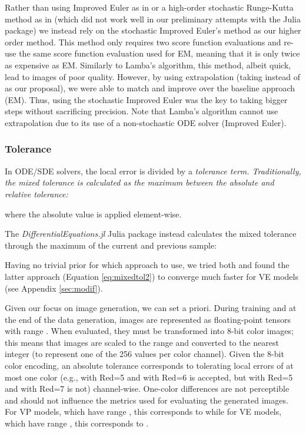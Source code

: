 \documentclass{article}
\begin{document}
Rather than using Improved Euler \citep{suli2003introduction} as in \citet{lamba2003adaptive} or a high-order stochastic Runge-Kutta method \citep{rossler2010runge} as in \citet{rackauckas2017adaptive} (which did not work well in our preliminary attempts with the Julia package) we instead rely on the stochastic Improved Euler's method \citep{roberts2012modify} as our higher order method. This method only requires two score function evaluations and re-use the same score function evaluation used for EM, meaning that it is only twice as expensive as EM. Similarly to Lamba's algorithm, this method, albeit quick, lead to images of poor quality. However, by using extrapolation (taking  instead of  as our proposal), we were able to match and improve over
the baseline approach (EM). Thus, using the stochastic Improved Euler was the key to taking bigger steps without sacrificing precision. Note that Lamba's algorithm cannot use extrapolation due to its use of a non-stochastic ODE solver (Improved Euler).

\subsubsection{Tolerance}

In ODE/SDE solvers, the local error is divided by a \em tolerance \em term.
Traditionally, the mixed tolerance  is calculated as the maximum between the absolute and relative tolerance:

where the absolute value  is applied element-wise.

The {\em DifferentialEquations.jl} Julia package instead calculates the  mixed tolerance 
through the maximum of the current and previous sample:


Having no trivial prior for which approach to use, we tried both and found the latter approach (Equation \ref{eq:mixedtol2}) to converge much faster for VE models (see Appendix \ref{sec:modif}).


Given our focus on image generation, we can set  a priori. During training and at the end of the data generation, images are represented as floating-point tensors with range . When evaluated, they must be transformed into 8-bit color images; this means that images are scaled to the range  and converted to the nearest integer (to represent one of the 256 values per color channel). Given the 8-bit color encoding, an absolute tolerance  corresponds to tolerating local errors of at most one color (e.g.,  with Red=5 and  with Red=6 is accepted, but  with Red=5 and  with Red=7 is not) channel-wise. One-color differences are not perceptible and should 
not influence the metrics used for evaluating the generated images.
For VP models, which have range , this corresponds to  while for VE models, which have range , this corresponds to .
\end{document}
